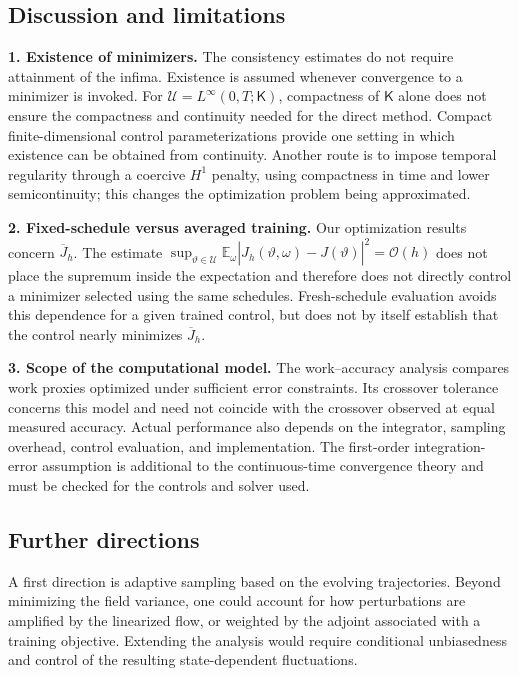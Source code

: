 \documentclass[twoside,11pt]{article}
\theoremstyle{plain}
\def\E{\mathbb E}
\begin{document}
\subsection*{Discussion and limitations}

\noindent\textbf{1. Existence of minimizers.}
The consistency estimates do not require attainment of the infima.
Existence is assumed whenever convergence to a minimizer is invoked.
For $\mathcal U=L^\infty(0,T;\mathsf K)$, compactness of
$\mathsf K$ alone does not ensure the compactness and continuity needed
for the direct method. Compact finite-dimensional control
parameterizations provide one setting in which existence can be obtained
from continuity. Another route is to impose temporal regularity through
a coercive $H^1$ penalty, using compactness in time and lower
semicontinuity; this changes the optimization problem being approximated.

\medbreak
\noindent\textbf{2. Fixed-schedule versus averaged training.}
Our optimization results concern $\overline J_h$. The estimate
$\sup_{\vartheta\in\mathcal U}\E_\omega
|\hat J_h(\vartheta,\omega)-J(\vartheta)|^2=\mathcal O(h)$
does not place the supremum inside the expectation and therefore does
not directly control a minimizer selected using the same schedules.
Fresh-schedule evaluation avoids this dependence for a given trained
control, but does not by itself establish that the control nearly
minimizes $\overline J_h$.

\medbreak
\noindent\textbf{3. Scope of the computational model.}
The work--accuracy analysis compares work proxies optimized under
sufficient error constraints. Its crossover tolerance concerns this
model and need not coincide with the crossover observed at equal measured
accuracy. Actual performance also depends on the integrator, sampling
overhead, control evaluation, and implementation. The first-order
integration-error assumption is additional to the continuous-time
convergence theory and must be checked for the controls and solver used.



\subsection*{Further directions}

A first direction is adaptive sampling based on the evolving trajectories.
Beyond minimizing the field variance, one could account
for how perturbations are amplified by the linearized flow, or weighted
by the adjoint associated with a training objective. Extending the
analysis would require conditional unbiasedness and control of the
resulting state-dependent fluctuations.
\end{document}
